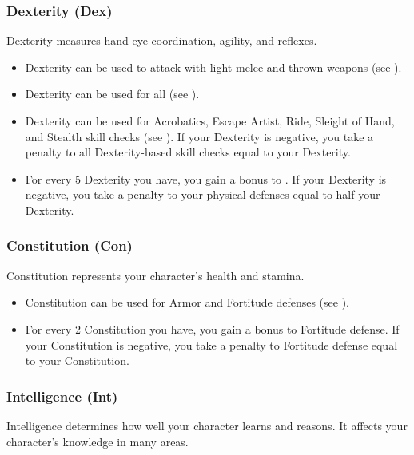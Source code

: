         \subsubsection{Dexterity (Dex)}\label{Dexterity}
            Dexterity measures hand-eye coordination, agility, and reflexes.
            \begin{itemize}
                \item Dexterity can be used to attack with light melee and thrown weapons (see ).
                \item Dexterity can be used for all  (see ).
                \item Dexterity can be used for Acrobatics, Escape Artist, Ride, Sleight of Hand, and Stealth skill checks (see ). If your Dexterity is negative, you take a penalty to all Dexterity-based skill checks equal to your Dexterity.
                \item For every 5 Dexterity you have, you gain a  bonus to . If your Dexterity is negative, you take a penalty to your physical defenses equal to half your Dexterity.
            \end{itemize}

        \subsubsection{Constitution (Con)}\label{Constitution}
            Constitution represents your character's health and stamina.
            \begin{itemize}
                \item Constitution can be used for Armor and Fortitude defenses (see ).
                \item For every 2 Constitution you have, you gain a  bonus to Fortitude defense. If your Constitution is negative, you take a penalty to Fortitude defense equal to your Constitution.
            \end{itemize}

        \subsubsection{Intelligence (Int)}\label{Intelligence}
            Intelligence determines how well your character learns and reasons.
            It affects your character's knowledge in many areas.

